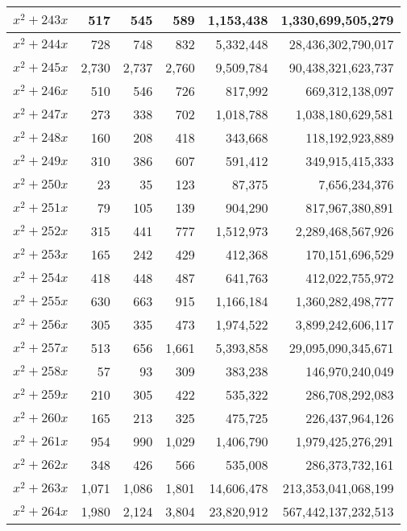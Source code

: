 \documentclass[a4paper]{amsproc}
\theoremstyle{plain}
\begin{document}
\begin{longtable}{ | l | r | r | r | r | r | }
$x^2 + 243x$ & 517 & 545 & 589 & 1{,}153{,}438 & 1{,}330{,}699{,}505{,}279 \\ \hline
$x^2 + 244x$ & 728 & 748 & 832 & 5{,}332{,}448 & 28{,}436{,}302{,}790{,}017 \\ \hline
$x^2 + 245x$ & 2{,}730 & 2{,}737 & 2{,}760 & 9{,}509{,}784 & 90{,}438{,}321{,}623{,}737 \\ \hline
$x^2 + 246x$ & 510 & 546 & 726 & 817{,}992 & 669{,}312{,}138{,}097 \\ \hline
$x^2 + 247x$ & 273 & 338 & 702 & 1{,}018{,}788 & 1{,}038{,}180{,}629{,}581 \\ \hline
$x^2 + 248x$ & 160 & 208 & 418 & 343{,}668 & 118{,}192{,}923{,}889 \\ \hline
$x^2 + 249x$ & 310 & 386 & 607 & 591{,}412 & 349{,}915{,}415{,}333 \\ \hline
$x^2 + 250x$ & 23 & 35 & 123 & 87{,}375 & 7{,}656{,}234{,}376 \\ \hline
$x^2 + 251x$ & 79 & 105 & 139 & 904{,}290 & 817{,}967{,}380{,}891 \\ \hline
$x^2 + 252x$ & 315 & 441 & 777 & 1{,}512{,}973 & 2{,}289{,}468{,}567{,}926 \\ \hline
$x^2 + 253x$ & 165 & 242 & 429 & 412{,}368 & 170{,}151{,}696{,}529 \\ \hline
$x^2 + 254x$ & 418 & 448 & 487 & 641{,}763 & 412{,}022{,}755{,}972 \\ \hline
$x^2 + 255x$ & 630 & 663 & 915 & 1{,}166{,}184 & 1{,}360{,}282{,}498{,}777 \\ \hline
$x^2 + 256x$ & 305 & 335 & 473 & 1{,}974{,}522 & 3{,}899{,}242{,}606{,}117 \\ \hline
$x^2 + 257x$ & 513 & 656 & 1{,}661 & 5{,}393{,}858 & 29{,}095{,}090{,}345{,}671 \\ \hline
$x^2 + 258x$ & 57 & 93 & 309 & 383{,}238 & 146{,}970{,}240{,}049 \\ \hline
$x^2 + 259x$ & 210 & 305 & 422 & 535{,}322 & 286{,}708{,}292{,}083 \\ \hline
$x^2 + 260x$ & 165 & 213 & 325 & 475{,}725 & 226{,}437{,}964{,}126 \\ \hline
$x^2 + 261x$ & 954 & 990 & 1{,}029 & 1{,}406{,}790 & 1{,}979{,}425{,}276{,}291 \\ \hline
$x^2 + 262x$ & 348 & 426 & 566 & 535{,}008 & 286{,}373{,}732{,}161 \\ \hline
$x^2 + 263x$ & 1{,}071 & 1{,}086 & 1{,}801 & 14{,}606{,}478 & 213{,}353{,}041{,}068{,}199 \\ \hline
$x^2 + 264x$ & 1{,}980 & 2{,}124 & 3{,}804 & 23{,}820{,}912 & 567{,}442{,}137{,}232{,}513 \\ \hline

\end{longtable}
\end{document}

